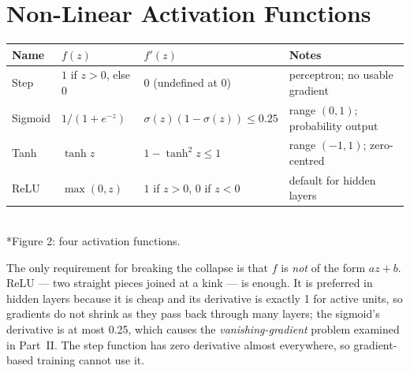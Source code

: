 \documentclass[11pt]{article}
\begin{document}
\section{Non-Linear Activation Functions}
\begin{center}\small\renewcommand{\arraystretch}{1.35}
\begin{tabular}{llll}\toprule
\textbf{Name} & $f(z)$ & $f'(z)$ & \textbf{Notes}\\\midrule
Step & $1$ if $z>0$, else $0$ & $0$ (undefined at 0) & perceptron; no usable gradient\\
Sigmoid & $1/(1+e^{-z})$ & $\sigma(z)(1-\sigma(z))\le0.25$ & range $(0,1)$; probability output\\
Tanh & $\tanh z$ & $1-\tanh^2z\le1$ & range $(-1,1)$; zero-centred\\
ReLU & $\max(0,z)$ & $1$ if $z>0$, $0$ if $z<0$ & default for hidden layers\\\bottomrule
\end{tabular}\end{center}
\begin{center}\\*{\small\color{GreyN}Figure 2: four activation functions.}\end{center}
The only requirement for breaking the collapse is that $f$ is \emph{not} of the form $az+b$. ReLU --- two straight pieces joined at a kink --- is enough. It is preferred in hidden layers because it is cheap and its derivative is exactly 1 for active units, so gradients do not shrink as they pass back through many layers; the sigmoid's derivative is at most 0.25, which causes the \emph{vanishing-gradient} problem examined in Part~II. The step function has zero derivative almost everywhere, so gradient-based training cannot use it.
\end{document}
